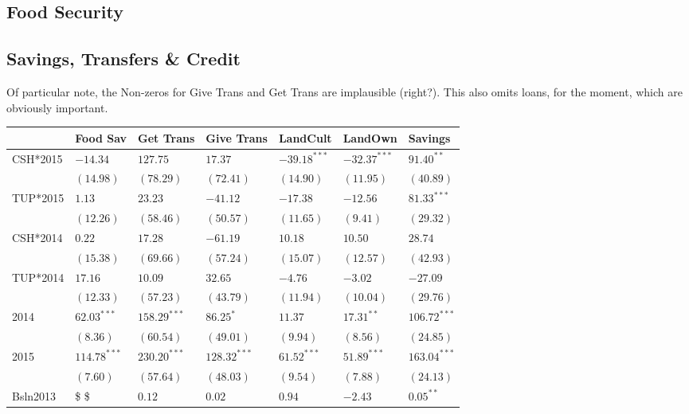 \documentclass[11pt]{article}
\begin{document}
\subsection{Food Security}
\label{sec:orgheadline24}

\subsection{Savings, Transfers \& Credit}
\label{sec:orgheadline25}

Of particular note, the Non-zeros for Give Trans and Get Trans are implausible
(right?). This also omits loans, for the moment, which are obviously important.

\begin{center}
\begin{tabular}{lllllll}
\hline
 & Food Sav & Get Trans & Give Trans & LandCult & LandOwn & Savings\\
\hline
CSH*2015 & \(-14.34\) & \(127.75\) & \(17.37\) & \(-39.18^{***}\) & \(-32.37^{***}\) & \(91.40^{**}\)\\
 & \((14.98)\) & \((78.29)\) & \((72.41)\) & \((14.90)\) & \((11.95)\) & \((40.89)\)\\
TUP*2015 & \(1.13\) & \(23.23\) & \(-41.12\) & \(-17.38\) & \(-12.56\) & \(81.33^{***}\)\\
 & \((12.26)\) & \((58.46)\) & \((50.57)\) & \((11.65)\) & \(( 9.41)\) & \((29.32)\)\\
CSH*2014 & \(0.22\) & \(17.28\) & \(-61.19\) & \(10.18\) & \(10.50\) & \(28.74\)\\
 & \((15.38)\) & \((69.66)\) & \((57.24)\) & \((15.07)\) & \((12.57)\) & \((42.93)\)\\
TUP*2014 & \(17.16\) & \(10.09\) & \(32.65\) & \(-4.76\) & \(-3.02\) & \(-27.09\)\\
 & \((12.33)\) & \((57.23)\) & \((43.79)\) & \((11.94)\) & \((10.04)\) & \((29.76)\)\\
2014 & \(62.03^{***}\) & \(158.29^{***}\) & \(86.25^{*}\) & \(11.37\) & \(17.31^{**}\) & \(106.72^{***}\)\\
 & \(( 8.36)\) & \((60.54)\) & \((49.01)\) & \(( 9.94)\) & \(( 8.56)\) & \((24.85)\)\\
2015 & \(114.78^{***}\) & \(230.20^{***}\) & \(128.32^{***}\) & \(61.52^{***}\) & \(51.89^{***}\) & \(163.04^{***}\)\\
 & \(( 7.60)\) & \((57.64)\) & \((48.03)\) & \(( 9.54)\) & \(( 7.88)\) & \((24.13)\)\\
Bsln2013 & \$ \$ & \(0.12\) & \(0.02\) & \(0.94\) & \(-2.43\) & \(0.05^{**}\)\\

\end{tabular}
\end{center}
\end{document}
